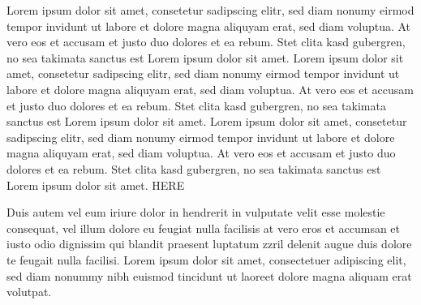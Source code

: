 \documentclass[a4paper,
	               twoside,
	               openright,
	               8pt,
	               final]
	               {memoir}
\begin{document}
	\begin{pairs}%
		\begin{Leftside}%
			\resumenumbering%
				 Lorem ipsum dolor sit amet, consetetur sadipscing elitr, sed diam nonumy eirmod tempor invidunt ut
labore et dolore magna aliquyam erat, sed diam voluptua. At vero eos et accusam et justo duo
dolores et ea rebum. Stet clita kasd gubergren, no sea takimata sanctus est Lorem ipsum dolor sit
amet. Lorem ipsum dolor sit amet, consetetur sadipscing elitr, sed diam nonumy eirmod tempor
invidunt ut labore et dolore magna aliquyam erat, sed diam voluptua. At vero eos et accusam et
justo duo dolores et ea rebum. Stet clita kasd gubergren, no sea takimata sanctus est Lorem ipsum
dolor sit amet. Lorem ipsum dolor sit amet, consetetur sadipscing elitr, sed diam nonumy eirmod
tempor invidunt ut labore et dolore magna aliquyam erat, sed diam voluptua. At vero eos et accusam
et justo duo dolores et ea rebum. Stet clita kasd gubergren, no sea takimata sanctus est Lorem
ipsum dolor sit amet. HERE
				\pend%
			\pausenumbering%
		\end{Leftside}%
		\begin{Rightside}%
			\resumenumbering%
				 Duis autem vel eum iriure dolor in hendrerit in vulputate velit esse molestie consequat, vel illum
dolore eu feugiat nulla facilisis at vero eros et accumsan et iusto odio dignissim qui blandit
praesent luptatum zzril delenit augue duis dolore te feugait nulla facilisi. Lorem ipsum dolor sit
amet, consectetuer adipiscing elit, sed diam nonummy nibh euismod tincidunt ut laoreet dolore magna
aliquam erat volutpat.
				\pend%
			\pausenumbering%
		\end{Rightside}%
	\end{pairs}%

  \Columns%

\pagebreak
\end{document}

